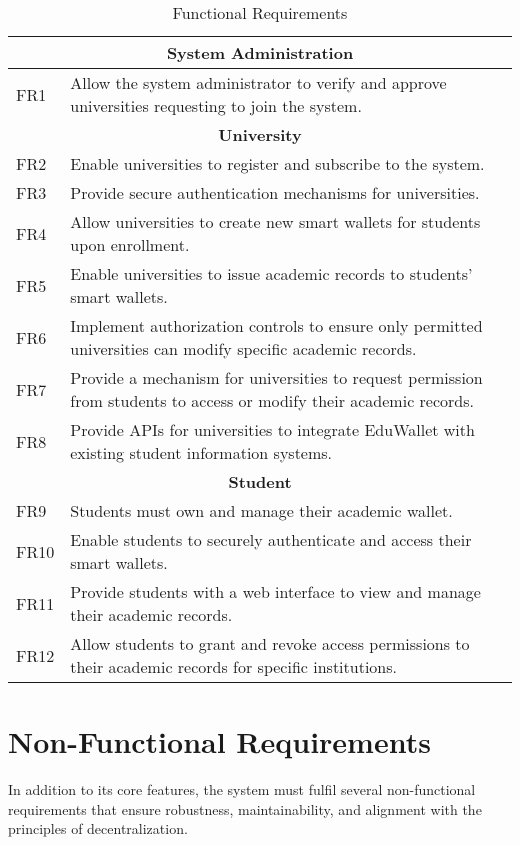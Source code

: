 \begin{table}
\centering
\caption{Functional Requirements}
\label{tab:funcReq}
\begin{tabular}{|p{1.0cm}|p{11cm}|}
\hline
\multicolumn{2}{|c|}{\textbf{System Administration}} \\
\hline
FR1 & Allow the system administrator to verify and approve universities requesting to join the system. \\
\hline
\multicolumn{2}{|c|}{\textbf{University}} \\
\hline
FR2 & Enable universities to register and subscribe to the system. \\
FR3 & Provide secure authentication mechanisms for universities. \\
FR4 & Allow universities to create new smart wallets for students upon enrollment. \\
FR5 & Enable universities to issue academic records to students' smart wallets. \\
FR6 & Implement authorization controls to ensure only permitted universities can modify specific academic records. \\
FR7 & Provide a mechanism for universities to request permission from students to access or modify their academic records. \\
FR8 & Provide APIs for universities to integrate EduWallet with existing student information systems. \\
\hline
\multicolumn{2}{|c|}{\textbf{Student}} \\
\hline
FR9  & Students must own and manage their academic wallet. \\
FR10 & Enable students to securely authenticate and access their smart wallets. \\
FR11 & Provide students with a web interface to view and manage their academic records. \\
FR12 & Allow students to grant and revoke access permissions to their academic records for specific institutions. \\
\hline
\end{tabular}
\end{table}

\section{Non-Functional Requirements}
\label{sec:nonFunctionalRequirements}
In addition to its core features, the system must fulfil several non-functional requirements that ensure robustness, maintainability, and alignment with the principles of decentralization. 

